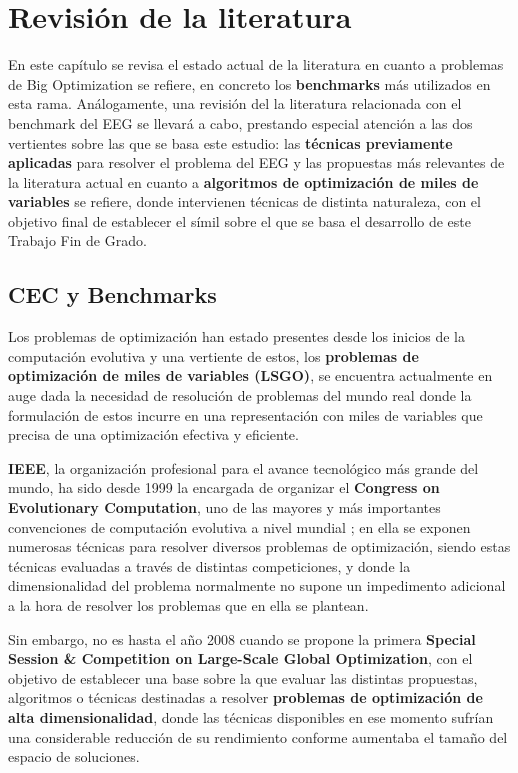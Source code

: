 \chapter{Revisión de la literatura}\label{cap: EstadoArte}

En este capítulo se revisa el estado actual de la literatura en cuanto a problemas de Big Optimization se refiere, en concreto los \textbf{benchmarks} más utilizados en esta rama. Análogamente, una revisión del la literatura relacionada con el benchmark del EEG se llevará a cabo, prestando especial atención a las dos vertientes sobre las que se basa este estudio: las \textbf{técnicas previamente aplicadas} para resolver el problema del EEG y las propuestas más relevantes de la literatura actual en cuanto a \textbf{algoritmos de optimización de miles de variables} se refiere, donde intervienen técnicas de distinta naturaleza, con el objetivo final de establecer el símil sobre el que se basa el desarrollo de este Trabajo Fin de Grado. 

\section{CEC y Benchmarks}

Los problemas de optimización  han estado presentes desde los inicios de la computación evolutiva y una vertiente de estos, los \textbf{problemas de optimización de miles de variables (LSGO)}, se encuentra actualmente en auge dada la necesidad de resolución de problemas del mundo real donde la formulación de estos incurre en una representación con miles de variables que precisa de una optimización efectiva y eficiente.

\textbf{IEEE}, la organización profesional para el avance tecnológico más grande del mundo, ha sido desde 1999 la encargada de organizar el \textbf{Congress on Evolutionary Computation}, uno de las mayores y más importantes convenciones de computación evolutiva a nivel mundial \cite{IEEECEC}; en ella se exponen numerosas técnicas para resolver diversos problemas de optimización, siendo estas técnicas evaluadas a través de distintas competiciones, y donde la dimensionalidad del problema normalmente no supone un impedimento adicional a la hora de resolver los problemas que en ella se plantean.

Sin embargo, no es hasta el año 2008 cuando se propone la primera \textbf{Special Session \& Competition on Large-Scale Global Optimization}\cite{CEC-LSGO}, con el objetivo de establecer una base sobre la que evaluar las distintas propuestas, algoritmos o técnicas destinadas a resolver\textbf{ problemas de optimización de alta dimensionalidad}, donde las técnicas disponibles en ese momento sufrían una considerable reducción de su rendimiento conforme aumentaba el tamaño del espacio de soluciones.

